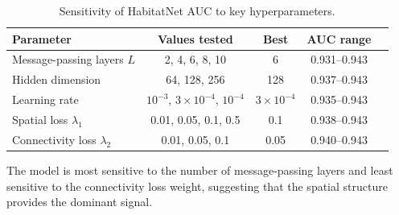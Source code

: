\documentclass[11pt,a4paper]{article}
\begin{document}
\begin{table}[H]
\centering
\caption{Sensitivity of HabitatNet AUC to key hyperparameters.}
\label{tab:hyperparams}
\begin{tabular}{lcccc}
\toprule
\textbf{Parameter} & \textbf{Values tested} & \textbf{Best} & \textbf{AUC range} \\
\midrule
Message-passing layers $L$ & 2, 4, 6, 8, 10 & 6 & 0.931--0.943 \\
Hidden dimension & 64, 128, 256 & 128 & 0.937--0.943 \\
Learning rate & $10^{-3}$, $3\times10^{-4}$, $10^{-4}$ & $3\times10^{-4}$ & 0.935--0.943 \\
Spatial loss $\lambda_1$ & 0.01, 0.05, 0.1, 0.5 & 0.1 & 0.938--0.943 \\
Connectivity loss $\lambda_2$ & 0.01, 0.05, 0.1 & 0.05 & 0.940--0.943 \\
\bottomrule
\end{tabular}
\end{table}

The model is most sensitive to the number of message-passing layers and
least sensitive to the connectivity loss weight, suggesting that the
spatial structure provides the dominant signal.
\end{document}
